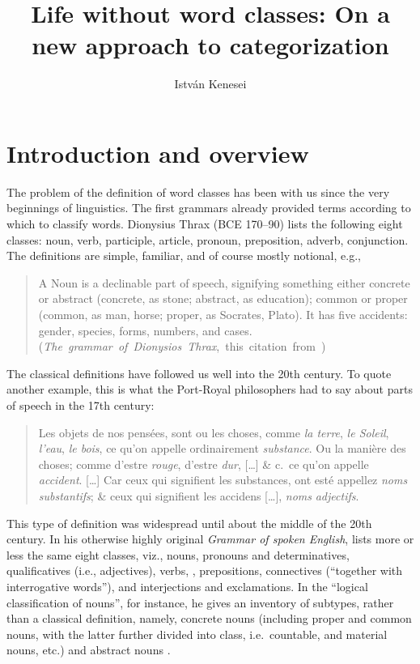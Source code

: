 \documentclass[output=paper]{langsci/langscibook}
\author{István Kenesei\affiliation{Research Institute for Linguistics,
Budapest, \& University of Szeged}}
\title{Life without word classes: On a new approach to categorization}
\begin{document}
\glsresetall

\section{Introduction and overview}\label{sec:27.1}

The problem of the definition of word classes has been with us since the very
beginnings of linguistics. The first grammars already provided terms according
to which to classify words. Dionysius Thrax (BCE 170--90) lists the following
eight classes: noun, verb, participle, article, pronoun, preposition, adverb,
conjunction. The definitions are simple, familiar, and of course mostly
notional, e.g.,

\begin{quote}
A Noun is a declinable part of speech, signifying something
either concrete or abstract (concrete, as stone; abstract, as education);
common or proper (common, as man, horse; proper, as Socrates, Plato). It has
five accidents: gender, species, forms, numbers, and cases.\\
\hbox{}\hfill\hbox{(\emph{The grammar of Dionysios Thrax}, this citation from \citealt[331]{Davidson1874})}
\end{quote}
The classical definitions have followed us well into the 20th century. To
quote another example, this is what the Port-Royal philosophers had to say
about parts of speech in the 17th century:

\begin{quote}
Les objets de nos pensées, sont ou les choses, comme \emph{la terre}, \emph{le
Soleil}, \emph{l’eau}, \emph{le bois}, ce qu’on appelle ordinairement
\emph{substance}. Ou la manière des choses; comme d’estre \emph{rouge}, d’estre
\emph{dur}, [\dots] \& c.\ ce qu’on appelle \emph{accident}. [\dots] Car ceux
qui signifient les substances, ont esté appellez \emph{noms substantifs}; \&
ceux qui signifient les accidens [\dots], \emph{noms} \emph{adjectifs}.\\
\hbox{}\hfill\hbox{\parencite[30--31]{LancelotArnauld1660}}
\end{quote}

This type of definition was widespread until about the middle of the 20th
century. In his otherwise highly original \emph{Grammar of spoken English},
\citet{Palmer1924} lists more or less the same eight classes, viz., nouns,
pronouns and determinatives, qualificatives (i.e., adjectives), verbs, ,
prepositions, connectives (“together with interrogative words”), and
interjections and exclamations. In the “logical classification of nouns”, for
instance, he gives an inventory of subtypes, rather than a classical
definition, namely, concrete nouns (including proper and common nouns, with the
latter further divided into class, i.e.\ countable, and material nouns, etc.)
and abstract nouns \citep[28--32]{Palmer1924}.
\end{document}
